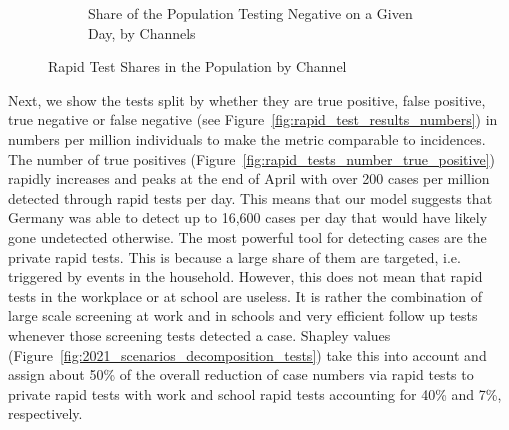 \begin{figure}[ht]
\begin{subfigure}[b]{0.3\textwidth}
        \caption{Share of the Population Testing Negative on a Given Day, by Channels}
        \label{fig:neg_rapid_tests_by_channel}
    \end{subfigure}
    \caption{Rapid Test Shares in the Population by Channel}
\end{figure}

\FloatBarrier

Next, we show the tests split by whether they are true positive, false positive, true
negative or false negative (see Figure~\ref{fig:rapid_test_results_numbers}) in numbers
per million individuals to make the metric comparable to incidences.
The number of true positives (Figure~\ref{fig:rapid_tests_number_true_positive}) rapidly
increases and peaks at the end of April with over 200 cases per million detected through
rapid tests per day. This means that our model suggests that Germany was able to detect
up to 16,600 cases per day that would have likely gone undetected otherwise. The most
powerful tool for detecting cases are the private rapid tests. This is because a large
share of them are targeted, i.e. triggered by events in the household. However, this
does not mean that rapid tests in the workplace or at school are useless. It is rather
the combination of large scale screening at work and in schools and very efficient
follow up tests whenever those screening tests detected a case. Shapley values
(Figure~\ref{fig:2021_scenarios_decomposition_tests}) take this into account and
assign about 50\% of the overall reduction of case numbers via rapid tests to private
rapid tests with work and school rapid tests accounting for 40\% and 7\%,
respectively.

